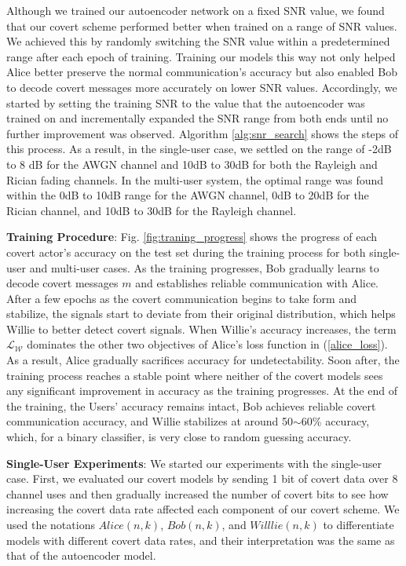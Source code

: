 Although we trained our autoencoder network on a fixed SNR value, we found that our covert scheme performed better when trained on a range of SNR values. We achieved this by randomly switching the SNR value within a predetermined range after each epoch of training. Training our models this way not only helped Alice better preserve the normal communication's accuracy but also enabled Bob to decode covert messages more accurately on lower SNR values. Accordingly, we started by setting the training SNR to the value that the autoencoder was trained on and incrementally expanded the SNR range from both ends until no further improvement was observed. Algorithm \ref{alg:snr_search} shows the steps of this process. As a result, in the single-user case, we settled on the range of -2dB to 8 dB for the AWGN channel and 10dB to 30dB for both the Rayleigh and Rician fading channels. In the multi-user system, the optimal range was found within the 0dB to 10dB range for the AWGN channel, 0dB to 20dB for the Rician channel, and 10dB to 30dB for the Rayleigh channel.

\textbf{Training Procedure}: Fig. \ref{fig:traning_progress} shows the progress of each covert actor's accuracy on the test set during the training process for both single-user and multi-user cases. As the training progresses, Bob gradually learns to decode covert messages \(m\) and establishes reliable communication with Alice. After a few epochs as the covert communication begins to take form and stabilize, the signals start to deviate from their original distribution, which helps Willie to better detect covert signals. When Willie's accuracy increases, the term \(\mathcal{L}_{\mathcal{W}}\) dominates the other two objectives of Alice's loss function in (\ref{alice_loss}). As a result, Alice gradually sacrifices accuracy for undetectability. Soon after, the training process reaches a stable point where neither of the covert models sees any significant improvement in accuracy as the training progresses. At the end of the training, the Users' accuracy remains intact, Bob achieves reliable covert communication accuracy, and Willie stabilizes at around 50$\sim$60\% accuracy, which, for a binary classifier, is very close to random guessing accuracy.

\textbf{Single-User Experiments}: 
We started our experiments with the single-user case. First, we evaluated our covert models by sending 1 bit of covert data over 8 channel uses and then gradually increased the number of covert bits to see how increasing the covert data rate affected each component of our covert scheme. We used the notations \(Alice (n,k)\), \(Bob (n,k)\), and \(Willlie (n,k)\) to differentiate models with different covert data rates, and their interpretation was the same as that of the autoencoder model.

